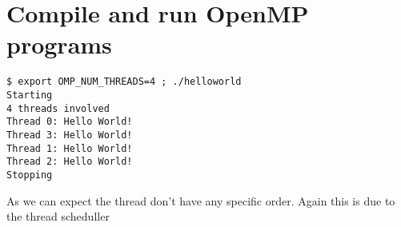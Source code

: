 \chapter{Compile and run OpenMP programs}

\begin{verbatim}
$ export OMP_NUM_THREADS=4 ; ./helloworld
Starting
4 threads involved
Thread 0: Hello World!
Thread 3: Hello World!
Thread 1: Hello World!
Thread 2: Hello World!
Stopping
\end{verbatim}

As we can expect the thread don't have any specific order. Again this is due to the thread scheduller

